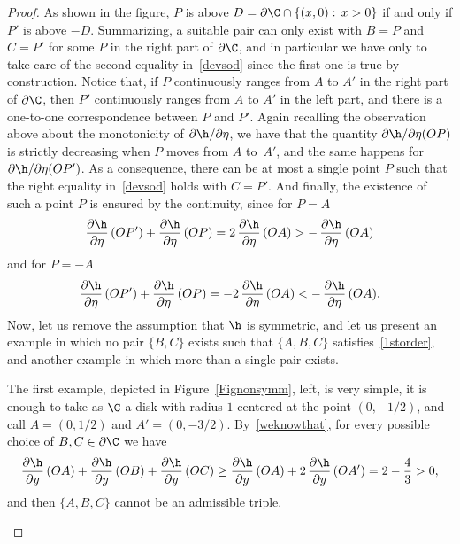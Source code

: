 \begin{proof}
As shown in the figure, $P$ is above \hbox{$D=\partial\C \cap \{(x,0):\, x>0\}$} if and only if $P'$ is above $-D$. Summarizing, a suitable pair can only exist with $B=P$ and $C=P'$ for some $P$ in the right part of $\partial\C$, and in particular we have only to take care of the second equality in~\eqref{devsod} since the first one is true by construction. Notice that, if $P$ continuously ranges from $A$ to $A'$ in the right part of $\partial\C$, then $P'$ continuously ranges from $A$ to $A'$ in the left part, and there is a one-to-one correspondence between $P$ and $P'$. Again recalling the observation above about the monotonicity of $\partial\h/\partial\eta$, we have that the quantity $\partial\h/\partial\eta(OP)$ is strictly decreasing when $P$ moves from $A$ to~$A'$, and the same happens for $\partial\h/\partial\eta(OP')$. As a consequence, there can be at most a single point $P$ such that the right equality in~\eqref{devsod} holds with $C=P'$. And finally, the existence of such a point $P$ is ensured by the continuity, since for $P=A$
\[
\frac{\partial\h}{\partial \eta}\, (OP') +\frac{\partial\h}{\partial \eta}\, (OP) = 2\,\frac{\partial\h}{\partial \eta}\, (OA) > - \,\frac{\partial\h}{\partial \eta}\, (OA)
\]
and for $P=-A$
\[
\frac{\partial\h}{\partial \eta}\, (OP') +\frac{\partial\h}{\partial \eta}\, (OP) = -2\,\frac{\partial\h}{\partial \eta}\, (OA) < - \,\frac{\partial\h}{\partial \eta}\, (OA).
\]
Now, let us remove the assumption that $\h$ is symmetric, and let us present an example in which no pair $\{B,C\}$ exists such that $\{A,B,C\}$ satisfies~\eqref{1storder}, and another example in which more than a single pair exists.\par
The first example, depicted in Figure~\ref{Fignonsymm}, left, is very simple, it is enough to take as $\C$ a disk with radius $1$ centered at the point $(0,-1/2)$, and call $A=(0,1/2)$ and $A'=(0,-3/2)$. By~\eqref{weknowthat}, for every possible choice of $B,C\in \partial\C$ we have
\[
\frac{\partial \h}{\partial y}\, (OA)+\frac{\partial \h}{\partial y}\, (OB)+\frac{\partial \h}{\partial y}\, (OC) \geq \frac{\partial \h}{\partial y}\, (OA) + 2\,\frac{\partial \h}{\partial y}\, (OA') = 2 - \frac 43 > 0,
\]
and then $\{A,B,C\}$ cannot be an admissible triple.\par
\begin{figure}[htbp]
\end{figure}
\end{proof}
